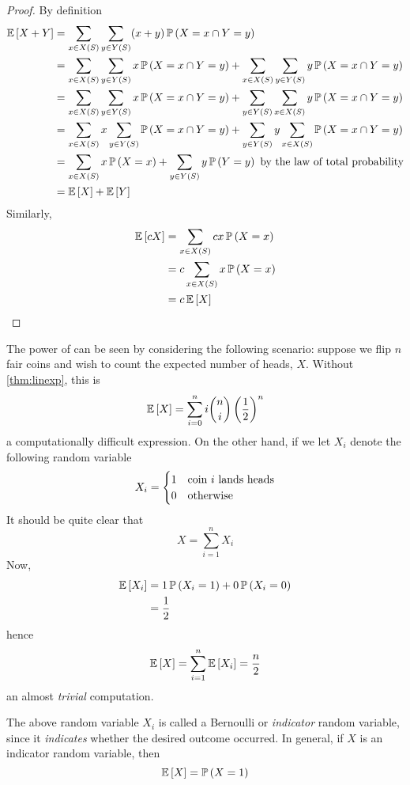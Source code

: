 \begin{proof}
    By definition
    \begin{align*}\operatorname{\mathbb{E}}\left[X + Y\right]
        &= \sum_{x \in X(S)}\sum_{y \in Y(S)} (x + y)\operatorname{\mathbb{P}}\left(X = x \cap Y = y\right)\\
        &= \sum_{x \in X(S)}\sum_{y \in Y(S)} x\operatorname{\mathbb{P}}\left(X = x \cap Y = y\right) + \sum_{x \in X(S)}\sum_{y \in Y(S)}y\operatorname{\mathbb{P}}\left(X = x \cap Y = y\right)\\
        &=\sum_{x \in X(S)}\sum_{y \in Y(S)} x\operatorname{\mathbb{P}}\left(X = x \cap Y = y\right) + \sum_{y \in Y(S)}\sum_{x \in X(S)}y\operatorname{\mathbb{P}}\left(X = x \cap Y = y\right)\\
        &=\sum_{x \in X(S)}x\sum_{y \in Y(S)} \operatorname{\mathbb{P}}\left(X = x \cap Y = y\right) + \sum_{y \in Y(S)}y\sum_{x \in X(S)}\operatorname{\mathbb{P}}\left(X = x \cap Y = y\right)\\
        &=\sum_{x \in X(S)}x\operatorname{\mathbb{P}}\left(X = x\right) + \sum_{y \in Y(S)}y\operatorname{\mathbb{P}}\left(Y = y\right) \hbox{ by the law of total probability}\\
        &=\operatorname{\mathbb{E}}\left[X\right] + \operatorname{\mathbb{E}}\left[Y\right]
    \end{align*}
    Similarly,
    \begin{align*}\operatorname{\mathbb{E}}\left[cX\right]
        &=\sum_{x \in X(S)}cx\operatorname{\mathbb{P}}\left(X = x\right)\\
        &=c\sum_{x \in X(S)}x\operatorname{\mathbb{P}}\left(X = x\right)\\
        &=c\operatorname{\mathbb{E}}\left[X\right]\qedhere
    \end{align*}
\end{proof}

The power of  can be seen by considering the following
scenario: suppose we flip $n$ fair coins and wish to count the expected number
of heads, $X$. Without \cref{thm:linexp}, this is
\[\operatorname{\mathbb{E}}\left[X\right] = \sum_{i=0}^ni\binom{n}{i}\left(\frac{1}{2}\right)^n\]
a computationally difficult expression. On the other hand, if we let $X_i$
denote the following random variable
\[X_i = \begin{cases}1 & \hbox{coin $i$ lands heads}\\
                     0 & \hbox{otherwise}\end{cases}\]
It should be quite clear that
\[X = \sum_{i=1}^n X_i\]
Now,
\begin{align*}\operatorname{\mathbb{E}}\left[X_i\right]
    &=1\operatorname{\mathbb{P}}\left(X_i = 1\right) + 0\operatorname{\mathbb{P}}\left(X_i = 0\right)\\
    &=\frac{1}{2}
\end{align*}
hence
\[\operatorname{\mathbb{E}}\left[X\right] = \sum_{i=1}^n\operatorname{\mathbb{E}}\left[X_i\right] = \frac{n}{2}\]
an almost \emph{trivial} computation.

The above random variable $X_i$ is called a Bernoulli or \emph{indicator} random
variable, since it \emph{indicates} whether the desired outcome occurred. In
general, if $X$ is an indicator random variable, then 
\[\operatorname{\mathbb{E}}\left[X\right] = \operatorname{\mathbb{P}}\left(X = 1\right)\]


